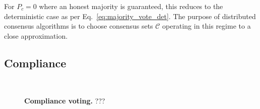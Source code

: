 For \mbox{$P_c=0$} where an honest majority is guaranteed, this reduces to the deterministic case as per Eq.~\eqref{eq:majority_vote_det}. The purpose of distributed consensus algorithms is to choose consensus sets $\mathcal{C}$ operating in this regime to a close approximation.


\subsection{Compliance}

\begin{figure}[!htb]
	\centering
	\resizebox{0.5\columnwidth}{!}{} \\
	\vspace{-2em}
	\resizebox{0.32\columnwidth}{!}{}
	\resizebox{0.32\columnwidth}{!}{}
	\resizebox{0.32\columnwidth}{!}{}
	\caption{\textbf{Compliance voting.} ???} \label{fig:compliance_voting}
\end{figure}